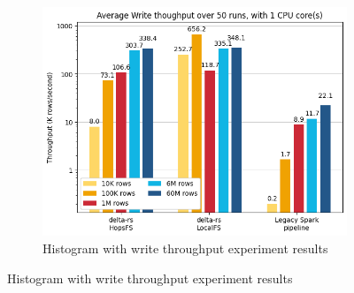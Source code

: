 \begin{figure}
    \centering
    \begin{subfigure}[b]{\textwidth}
        \includegraphics[width=\textwidth]{figures/5-results/write/write_throughput_1_core.png}
        \caption{Histogram with write throughput experiment results}
        \label{fig:res_write_throughput}
    \end{subfigure}
    

\end{figure}
